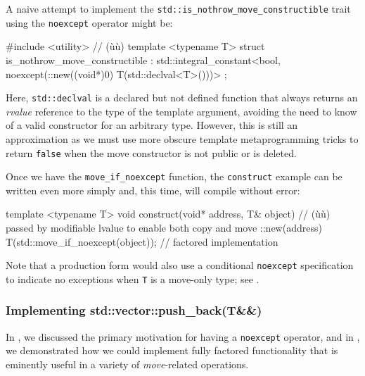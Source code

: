A naive attempt to implement the
\lstinline!std::is_nothrow_move_constructible! trait using the
\lstinline!noexcept! operator might be:

\begin{emcppslisting}
#include <utility>  // (ù{}ù)
template <typename T>
struct is_nothrow_move_constructible
    : std::integral_constant<bool,
                             noexcept(::new((void*)0) T(std::declval<T>()))>
{
};
\end{emcppslisting}
    

\noindent Here, \lstinline!std::declval! is a declared but not defined function that
always returns an \emph{rvalue} reference to the type of the template
argument, avoiding the need to know of a valid constructor for an
arbitrary type. However, this is still an approximation as we must use
more obscure template metaprogramming tricks to return \lstinline!false!
when the move constructor is not public or is deleted.

Once we have the \lstinline!move_if_noexcept! function, the
\lstinline!construct! example can be written even more simply and, this
time, will compile without error:

\begin{emcppslisting}[emcppsbatch=e21]
template <typename T>
void construct(void* address, T& object)
     // (ù{}ù) passed by modifiable lvalue to enable both copy and move
{
    ::new(address) T(std::move_if_noexcept(object));  // factored implementation
}
\end{emcppslisting}
    

\noindent Note that a production form would also use a conditional
\lstinline!noexcept! specification to indicate no exceptions when
\lstinline!T! is a move-only type; see .

\subsubsection[Implementing \lstinline!std::vector::push_back(T&&)!]{Implementing {\SubsubsecCode std::vector::push\_back(T\&\&)}}\label{implementing-std::vector::push_back(t&&)}

In , we discussed the primary motivation for having
a \lstinline!noexcept! operator, and in , we demonstrated how we could
implement fully factored functionality that is eminently useful in a
variety of \emph{move}-related operations.

